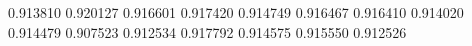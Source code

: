 0.913810
0.920127
0.916601
0.917420
0.914749
0.916467
0.916410
0.914020
0.914479
0.907523
0.912534
0.917792
0.914575
0.915550
0.912526
